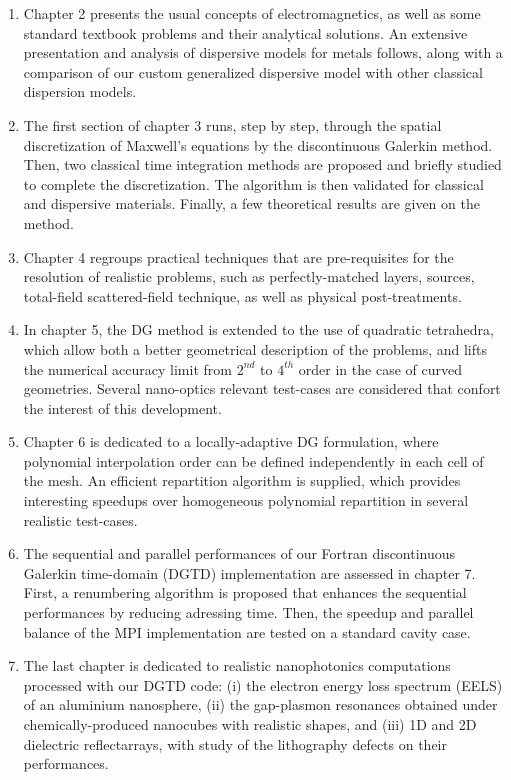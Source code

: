 \begin{enumerate}
	\item Chapter 2 presents the usual concepts of electromagnetics, as well as some standard textbook problems and their analytical solutions. An extensive presentation and analysis of dispersive models for metals follows, along with a comparison of our custom generalized dispersive model with other classical dispersion models.
	\item The first section of chapter 3 runs, step by step, through the spatial discretization of Maxwell's equations by the discontinuous Galerkin method. Then, two classical time integration methods are proposed and briefly studied to complete the discretization. The algorithm is then validated for classical and dispersive materials. Finally, a few theoretical results are given on the method.
	\item Chapter 4 regroups practical techniques that are pre-requisites for the resolution of realistic problems, such as perfectly-matched layers, sources, total-field scattered-field technique, as well as physical post-treatments.
	\item In chapter 5, the DG method is extended to the use of quadratic tetrahedra, which allow both a better geometrical description of the problems, and lifts the numerical accuracy limit from $2^{nd}$ to $4^{th}$ order in the case of curved geometries. Several nano-optics relevant test-cases are considered that confort the interest of this development.
	\item Chapter 6 is dedicated to a locally-adaptive DG formulation, where polynomial interpolation order can be defined independently in each cell of the mesh. An efficient repartition algorithm is supplied, which provides interesting speedups over homogeneous polynomial repartition in several realistic test-cases.
	\item The sequential and parallel performances of our Fortran discontinuous Galerkin time-domain (DGTD) implementation are assessed in chapter 7. First, a renumbering algorithm is proposed that enhances the sequential performances by reducing adressing time. Then, the speedup and parallel balance of the MPI implementation are tested on a standard cavity case.
	\item The last chapter is dedicated to realistic nanophotonics computations processed with our DGTD code: (i) the electron energy loss spectrum (EELS) of an aluminium nanosphere, (ii) the gap-plasmon resonances obtained under chemically-produced nanocubes with realistic shapes, and (iii) 1D and 2D dielectric reflectarrays, with study of the lithography defects on their performances.
\end{enumerate}
